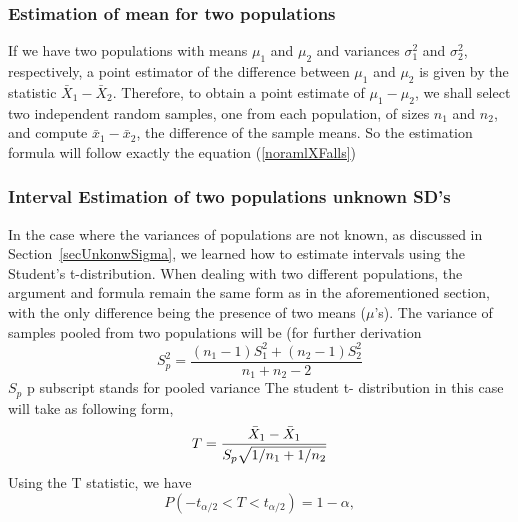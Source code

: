 \documentclass[12pt,a4paper]{article}
\theoremstyle{example}
\theoremstyle{definition}
\theoremstyle{theorem}
\begin{document}
\subsubsection{Estimation of mean for two populations}
If we have two populations with means \(\mu_1\) and \(\mu_2\) and variances \(\sigma_1^2\) and \(\sigma_2^2\), respectively, a point estimator of the difference between \(\mu_1\) and \(\mu_2\) is given by the statistic \(\bar{X}_1 - \bar{X}_2\). Therefore, to obtain a point estimate of \(\mu_1 - \mu_2\), we shall select two independent random samples, one from each population, of sizes \(n_1\) and \(n_2\), and compute \(\bar{x}_1 - \bar{x}_2\), the difference of the sample means. So the estimation formula will follow exactly the equation (\ref{noramlXFalls})

\subsubsection{Interval Estimation of two populations unknown SD's  }
 In the case where the variances of populations are not known, as discussed in Section~\ref{secUnkonwSigma}, we learned how to estimate intervals using the Student's t-distribution. When dealing with two different populations, the argument and formula remain the same form as in the aforementioned section, with the only difference being the presence of two means (\(\mu\)'s).
 The variance of samples pooled from two populations will be (for further derivation \citep{walpole1993probability}
\begin{equation}
    S_p^2=\frac{(n_1-1)S_1^2+(n_2-1)S_2^2}{n_1+n_2-2}
\end{equation}
 $S_p$ p subscript stands for pooled variance 
The student t- distribution in this case will take as following form,
\begin{equation}
    T=\frac{\Bar{X}_{1}-\Bar{X}_{1}}{S_p \sqrt{1/n_1+1/n_2}}
\end{equation}
Using the T statistic, we have
\begin{equation}
    P\left(-t_{\alpha/2} < T < t_{\alpha/2}\right) = 1 - \alpha,
\end{equation}
\end{document}
